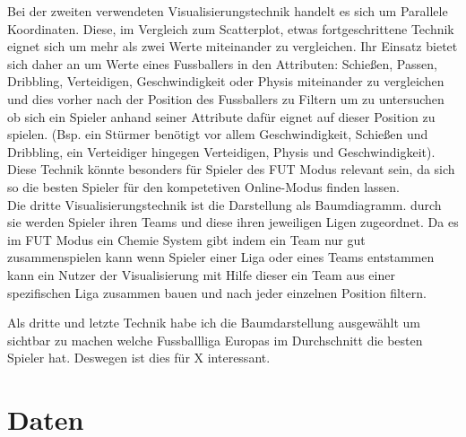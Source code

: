 \documentclass[usegeometry=true]{scrartcl}
\begin{document}
Bei der zweiten verwendeten Visualisierungstechnik handelt es sich um Parallele Koordinaten. Diese, im Vergleich zum Scatterplot, etwas fortgeschrittene Technik eignet sich um mehr als zwei Werte miteinander zu vergleichen. Ihr Einsatz bietet sich daher an um Werte eines Fussballers in den Attributen: Schießen, Passen, Dribbling, Verteidigen, Geschwindigkeit oder Physis miteinander zu vergleichen und dies vorher nach der Position des Fussballers zu Filtern um zu untersuchen ob sich ein Spieler anhand seiner Attribute dafür eignet auf dieser Position zu spielen. (Bsp. ein Stürmer benötigt vor allem Geschwindigkeit, Schießen und Dribbling, ein Verteidiger hingegen Verteidigen, Physis und Geschwindigkeit).
Diese Technik könnte besonders für Spieler des FUT Modus relevant sein, da sich so die besten Spieler für den kompetetiven Online-Modus finden lassen.\\

Die dritte Visualisierungstechnik ist die Darstellung als Baumdiagramm. durch sie werden Spieler ihren Teams und diese ihren jeweiligen Ligen zugeordnet. Da es im FUT Modus ein Chemie System gibt indem ein Team nur gut zusammenspielen kann wenn Spieler einer Liga oder eines Teams entstammen kann ein Nutzer der Visualisierung mit Hilfe dieser ein Team aus einer spezifischen Liga zusammen bauen und nach jeder einzelnen Position filtern\cite{heib_fifa_2021}.



Als dritte und letzte Technik habe ich die Baumdarstellung ausgewählt um sichtbar zu machen welche Fussballliga Europas im Durchschnitt die besten Spieler hat. Deswegen ist dies für X interessant.\\
\fi
\section{Daten}
\end{document}
